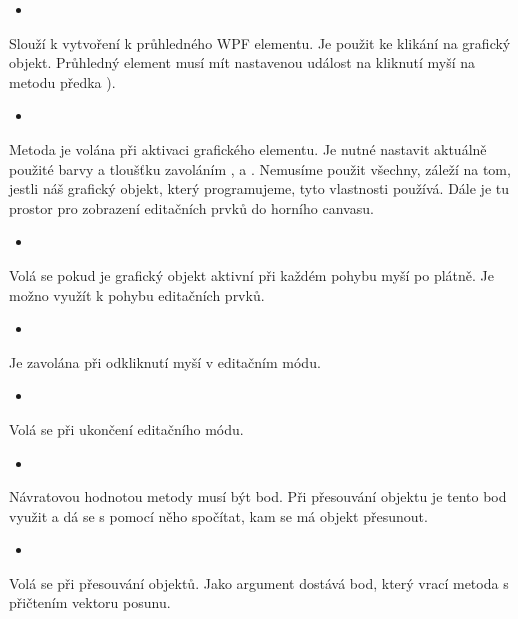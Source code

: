 \documentclass[
  field=inf,
  biblatex,
  glossaries,
  index
]{kidiplom}
\begin{document}
\begin{itemize}
\item {}
\end{itemize}
Slouží k vytvoření k průhledného WPF elementu. Je použit ke klikání na grafický objekt. Průhledný element musí mít nastavenou událost na kliknutí myší na metodu předka ).

\begin{itemize}
\item {}
\end{itemize}
Metoda je volána při aktivaci grafického elementu. Je nutné nastavit aktuálně použité barvy a tloušťku zavoláním ,  a . Nemusíme použit všechny, záleží na tom, jestli náš grafický objekt, který programujeme, tyto vlastnosti používá.
Dále je tu prostor pro zobrazení editačních prvků do horního canvasu.

\begin{itemize}
\item {}
\end{itemize}
Volá se pokud je grafický objekt aktivní při každém pohybu myší po plátně. Je možno využít k pohybu editačních prvků.

\begin{itemize}
\item {}
\end{itemize}
Je zavolána při odkliknutí myší v editačním módu.

\begin{itemize}
\item {}
\end{itemize}
Volá se při ukončení editačního módu.

\begin{itemize}
\item {}
\end{itemize}
Návratovou hodnotou metody musí být bod. Při přesouvání objektu je tento bod využit a dá se s pomocí něho spočítat, kam se má objekt přesunout.

\begin{itemize}
\item {}
\end{itemize}
Volá se při přesouvání objektů. Jako argument dostává bod, který vrací metoda  s přičtením vektoru posunu.
\end{document}
